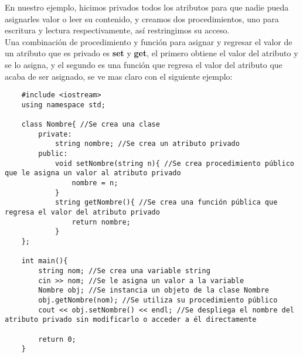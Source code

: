 En nuestro ejemplo, hicimos privados todos los atributos para que nadie pueda asignarles valor o leer su contenido, y creamos dos procedimientos, uno para escritura y lectura respectivamente, así restringimos su acceso.\\
Una combinación de procedimiento y función para asignar y regresar el valor de un atributo que es privado es \textbf{set} y \textbf{get}, el primero obtiene el valor del atributo y se lo asigna, y el segundo es una función que regresa el valor del atributo que acaba de ser asignado, se ve mas claro con el siguiente ejemplo:
\begin{lstlisting}
    #include <iostream>
    using namespace std;

    class Nombre{ //Se crea una clase
        private:
            string nombre; //Se crea un atributo privado
        public:
            void setNombre(string n){ //Se crea procedimiento público que le asigna un valor al atributo privado
                nombre = n;
            }
            string getNombre(){ //Se crea una función pública que regresa el valor del atributo privado
                return nombre;
            }
    };
    
    int main(){
        string nom; //Se crea una variable string
        cin >> nom; //Se le asigna un valor a la variable
        Nombre obj; //Se instancia un objeto de la clase Nombre
        obj.getNombre(nom); //Se utiliza su procedimiento público
        cout << obj.setNombre() << endl; //Se despliega el nombre del atributo privado sin modificarlo o acceder a él directamente
        
        return 0;
    }
\end{lstlisting}

